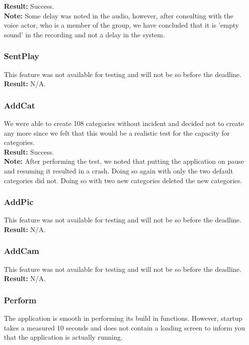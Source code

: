 \textbf{Result:} Success.\\

\textbf{Note:} Some delay was noted in the audio, however, after consulting with the voice actor, who is a member of the group, we have concluded that it is 'empty sound' in the recording and not a delay in the system.

\subsubsection*{SentPlay}
This feature was not available for testing and will not be so before the deadline.\\

\textbf{Result:} N/A.

\subsubsection*{AddCat}
We were able to create 108 categories without incident and decided not to create any more since we felt that this would be a realistic test for the capacity for categories.\\

\textbf{Result:} Success.\\

\textbf{Note:} After performing the test, we noted that putting the application on pause and resuming it resulted in a crash. Doing so again with only the two default categories did not. Doing so with two new categories deleted the new categories.

\subsubsection*{AddPic}
This feature was not available for testing and will not be so before the deadline.\\

\textbf{Result:} N/A.

\subsubsection*{AddCam}
This feature was not available for testing and will not be so before the deadline.\\

\textbf{Result:} N/A.

\subsubsection*{Perform}
The application is smooth in performing its build in functions.
However, startup takes a measured  10 seconds and does not contain a loading screen to inform you that the application is actually running.\\


